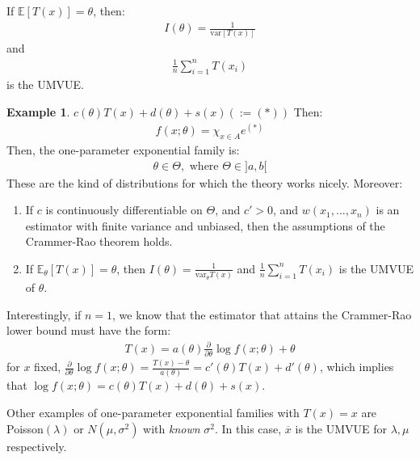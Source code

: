 \documentclass[11pt]{scrartcl}
\theoremstyle{definition}
\newtheorem{ex}{Example}
\theoremstyle{remark}
\newcommand{\EX}[1]{\mathbb{E}\left[#1 \right]}
\newcommand{\EXth}[1]{\mathbb{E}_\theta \left[ #1 \right]}
\begin{document}
{If $\EX{T(x)} = \theta$, then: 
\begin{align*}
	I(\theta) = \frac{1}{\text{var}[T(x)]}	
\end{align*}
and
\begin{align*}
	\frac{1}{n} \sum_{i=1}^n T(x_i) 	
\end{align*}
is the UMVUE. 


\begin{ex} 
	$c(\theta)T(x) + d(\theta) + s(x) (:= (*)) $ Then: 
	\begin{align*}
		f(x; \theta) = \chi_{x \in A} e^{(*)} 	
	\end{align*}
	Then, the one-parameter exponential family is: 
	\begin{align*}
		\theta \in \Theta, \text{ where } \Theta \in ]a,b[ 	
	\end{align*}
	These are the kind of distributions for which the theory works nicely. Moreover: 
	\begin{enumerate}[noitemsep]
		\item If $c$ is continuously differentiable on $\Theta$, and $c' > 0$, and $w(x_1, ..., x_n)$ is an estimator with finite variance and unbiased, then the assumptions of the Crammer-Rao theorem holds. 
		\item If $\EXth{T(x)} = \theta$, then $I(\theta) = \frac{1}{\text{var}_\theta T(x)}$ and $\frac{1}{n} \sum_{i=1}^n T(x_i)$ is the UMVUE of $\theta$. 
	\end{enumerate}
	Interestingly, if $n=1$, we know that the estimator that attains the Crammer-Rao lower bound must have the form: 
	\begin{align*}
		T(x) = a (\theta) \frac{\partial}{\partial \theta} \log f(x; \theta) + \theta 	
	\end{align*}
	for $x$ fixed, $\frac{\partial}{\partial \theta} \log f(x; \theta) = \frac{T(x) - \theta}{a(\theta)} = c'(\theta)T(x) + d'(\theta)$, which implies that $\log f(x; \theta) = c(\theta)T(x) + d(\theta) + s(x)$. 
	
	Other examples of one-parameter exponential families with $T(x) = x$ are Poisson$(\lambda)$ or $N(\mu, \sigma^2)$ with \emph{known} $\sigma^2$. In this case, $\overline{x}$ is the UMVUE for $\lambda, \mu$ respectively. 
\end{ex}

}
\end{document}
